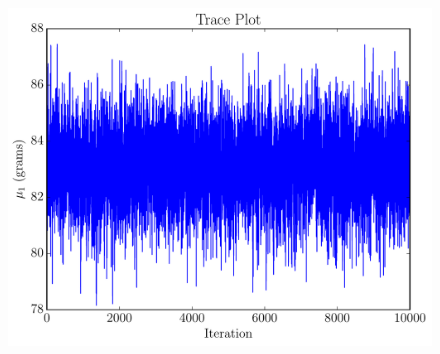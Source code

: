 \begin{figure}[ht!]
\begin{center}
\includegraphics[scale=0.6]{Figures/trace_starlings2.pdf}
\end{center}
\end{figure}

